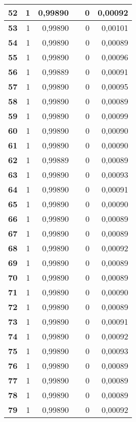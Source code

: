 \begin{longtable}{|r|r|r|l|r|r|}
\textbf{52} & 1 & 0,99890 &  & 0 & 0,00092 \\ \hline
\textbf{53} & 1 & 0,99890 &  & 0 & 0,00101 \\ \hline
\textbf{54} & 1 & 0,99890 &  & 0 & 0,00089 \\ \hline
\textbf{55} & 1 & 0,99890 &  & 0 & 0,00096 \\ \hline
\textbf{56} & 1 & 0,99889 &  & 0 & 0,00091 \\ \hline
\textbf{57} & 1 & 0,99890 &  & 0 & 0,00095 \\ \hline
\textbf{58} & 1 & 0,99890 &  & 0 & 0,00089 \\ \hline
\textbf{59} & 1 & 0,99890 &  & 0 & 0,00099 \\ \hline
\textbf{60} & 1 & 0,99890 &  & 0 & 0,00090 \\ \hline
\textbf{61} & 1 & 0,99890 &  & 0 & 0,00090 \\ \hline
\textbf{62} & 1 & 0,99889 &  & 0 & 0,00089 \\ \hline
\textbf{63} & 1 & 0,99890 &  & 0 & 0,00093 \\ \hline
\textbf{64} & 1 & 0,99890 &  & 0 & 0,00091 \\ \hline
\textbf{65} & 1 & 0,99890 &  & 0 & 0,00090 \\ \hline
\textbf{66} & 1 & 0,99890 &  & 0 & 0,00089 \\ \hline
\textbf{67} & 1 & 0,99890 &  & 0 & 0,00089 \\ \hline
\textbf{68} & 1 & 0,99890 &  & 0 & 0,00092 \\ \hline
\textbf{69} & 1 & 0,99890 &  & 0 & 0,00089 \\ \hline
\textbf{70} & 1 & 0,99890 &  & 0 & 0,00089 \\ \hline
\textbf{71} & 1 & 0,99890 &  & 0 & 0,00090 \\ \hline
\textbf{72} & 1 & 0,99890 &  & 0 & 0,00089 \\ \hline
\textbf{73} & 1 & 0,99890 &  & 0 & 0,00091 \\ \hline
\textbf{74} & 1 & 0,99890 &  & 0 & 0,00092 \\ \hline
\textbf{75} & 1 & 0,99890 &  & 0 & 0,00093 \\ \hline
\textbf{76} & 1 & 0,99890 &  & 0 & 0,00089 \\ \hline
\textbf{77} & 1 & 0,99890 &  & 0 & 0,00089 \\ \hline
\textbf{78} & 1 & 0,99890 &  & 0 & 0,00089 \\ \hline
\textbf{79} & 1 & 0,99890 &  & 0 & 0,00092 \\ \hline

\end{longtable}
